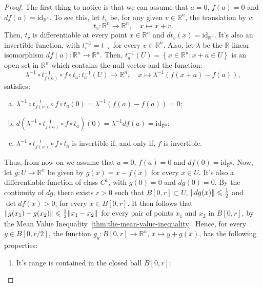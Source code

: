 \begin{proof}
	The first thing to notice is that we can assume that \({a=0}\), \(f(a)=0\) and
	\(df(a)=\text{id}_{\mathbb{R}^{n}}\). To see this, let \(t_{v}\) be, for any
	given \({v}\in{\mathbb{R}^{n}}\), the translation by \(v\):
	\[
		t_{v}:\mathbb{R}^{n}\to\mathbb{R}^{n},\quad{{x}\mapsto{x+v}}.
	\]
	Then, \(t_{v}\) is differentiable at every point \({x}\in{\mathbb{R}^{n}}\)
	and \(dt_{v}(x)=\text{id}_{\mathbb{R}^{n}}\). It's also an invertible
	function, with \(t_{v}^{-1}=t_{-v}\) for every \({v}\in{\mathbb{R}^{n}}\).
	Also, let \(\lambda\) be the \(\mathbb{R}\)-linear isomorphism
	\(df(a):\mathbb{R}^{n}\to\mathbb{R}^{n}\). Then,
	\(t_{a}^{-1}(U)=\left\{{x}\in{\mathbb{R}^{n}}:{x+a}\in{U}\right\}\) is an open
	set in \(\mathbb{R}^{n}\) which contains the null vector and the function:
	\[
		\lambda^{-1}\circ{t_{f(a)}^{-1}}\circ{f}\circ{t_{a}}:t_{a}^{-1}(U)\to\mathbb{R}^{n},\quad{{x}\mapsto{\lambda^{-1}(f(x+a)-f(a))}},
	\]
	satisfies:
	\begin{enumerate}[a.]
		\item
		      \(\lambda^{-1}\circ{t_{f(a)}^{-1}}\circ{f}\circ{t_{a}}(0)=\lambda^{-1}\left(f(a)-f(a)\right)=0\);
		\item
		      \(d(\lambda^{-1}\circ{t_{f(a)}^{-1}}\circ{f}\circ{t_{a}})(0)=\lambda^{-1}df(a)=\text{id}_{\mathbb{R}^{n}}\);
		\item
		      \(\lambda^{-1}\circ{t_{f(a)}^{-1}}\circ{f}\circ{t_{a}}\) is
		      invertible if, and only if, \(f\) is invertible.
	\end{enumerate}
	Thus, from now on we assume that \(a=0\), \(f(a)=0\) and
	\(df(0)=\text{id}_{\mathbb{R}^{n}}\). Now, let \(g:{U}\to{\mathbb{R}^{n}}\) be
	given by \(g(x)=x-f(x)\) for every \({x}\in{U}\). It's also a differentiable
	function of class \(C^{1}\), with \(g(0)=0\) and \(dg(0)=0\). By the
	continuity of \(dg\), there exists \(r>0\) such that \({B[0,r]}\subset{U}\),
	\(\lVert dg(x)\rVert\leqslant{\frac{1}{2}}\) and \(\det{df(x)}>0\), for every
	\({x}\in{B[0,r]}\). It then follows that
	\(\lVert g(x_{1})-g(x_{2})\rVert\leqslant{\frac{1}{2}\lVert x_{1}-x_{2}\rVert}\) for every
	pair of points \(x_{1}\) and \(x_{2}\) in \(B[0,r]\), by the Mean Value
	Inequality~\ref{thm:the-mean-value-inequality}. Hence, for every
	\({y}\in{B[0,r/2]}\), the function \(g_{y}:B[0,r]\to\mathbb{R}^{n}\),
	\({x}\mapsto{y+g(x)}\), has the following properties:
	\begin{enumerate}
		\item
		      It's range is contained in the closed ball \(B[0,r]\):
		      \[
\]
\end{enumerate}
\end{proof}
